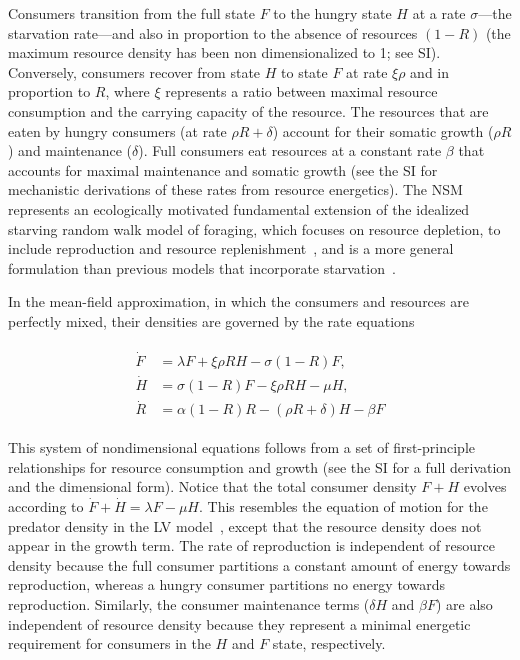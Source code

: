 \documentclass[twocolumn,preprintnumbers,amsmath,amssymb,superscriptaddress]{revtex4}
\begin{document}
Consumers transition from the full state $F$ to the hungry state $H$ at a
rate $\sigma$---the starvation rate---and also in proportion to the absence
of resources $(1-R)$ (the maximum resource density has been non
dimensionalized to 1; see SI).  Conversely, consumers recover from state $H$
to state $F$ at rate $\xi \rho$ and in proportion to $R$, where $\xi$
represents a ratio between maximal resource consumption and the carrying
capacity of the resource. %
The resources that are eaten by hungry consumers (at rate $\rho R + \delta$)
account for their somatic growth ($\rho R$) and maintenance ($\delta$).  Full
consumers eat resources at a constant rate $\beta$ that accounts for maximal
maintenance and somatic growth (see the SI for mechanistic derivations of
these rates from resource energetics).
The NSM represents an ecologically motivated fundamental extension of the
idealized starving random walk model of foraging, which focuses on resource
depletion, to include reproduction and resource
replenishment~\citep{Benichou:2014wu,Benichou:2016wl,Chupeau:2016jf}, and is
a more general formulation than previous models that incorporate
starvation~\citep{Persson:1998hz}.

In the mean-field approximation, in which the consumers and resources are
perfectly mixed, their densities are governed by the rate equations

\begin{align}
\label{eq:system}
\begin{split}
\dot{F} &= \lambda F + \xi \rho RH - \sigma \left(1-R\right)F,  \\
\dot{H} &= \sigma \left(1-R\right)F - \xi \rho RH - \mu H,  \\
\dot{R} &= \alpha \left(1-R\right)R -\left(\rho R+\delta\right)H-\beta F
\end{split}
\end{align}

This system of nondimensional equations follows from a set of first-principle
relationships for resource consumption and growth (see the SI for a full derivation and the dimensional form).
Notice that the total consumer density $F+H$ evolves according to $\dot{F}+\dot{H}=\lambda F-\mu H$.
This resembles the equation of motion for the predator density in the LV model~\citep{murray2011mathematical}, except that the resource density does not appear in the growth term.
The rate of reproduction is independent of resource density because the full
consumer partitions a constant amount of energy towards reproduction, whereas
a hungry consumer partitions no energy towards reproduction.  Similarly, the
consumer maintenance terms ($\delta H$ and $\beta F$) are also independent of
resource density because they represent a minimal energetic requirement for
consumers in the $H$ and $F$ state, respectively.
\end{document}
